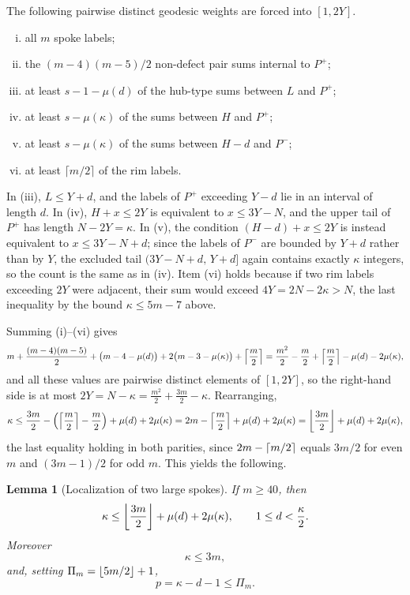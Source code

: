 \documentclass[11pt]{article}
\newtheorem{lemma}[theorem]{Lemma}
\theoremstyle{definition}
\theoremstyle{remark}
\numberwithin{equation}{section}
\DeclarePairedDelimiter{\floor}{\lfloor}{\rfloor}
\DeclarePairedDelimiter{\ceil}{\lceil}{\rceil}
\begin{document}
The following pairwise distinct geodesic weights are forced into $[1,2Y]$.
\begin{enumerate}[(i)]
\item all $m$ spoke labels;
\item the $(m-4)(m-5)/2$ non-defect pair sums internal to $P^+$;
\item at least $s-1-\mu(d)$ of the hub-type sums between $L$ and $P^+$;
\item at least $s-\mu(\kappa)$ of the sums between $H$ and $P^+$;
\item at least $s-\mu(\kappa)$ of the sums between $H-d$ and $P^-$;
\item at least $\lceil m/2\rceil$ of the rim labels.
\end{enumerate}
In (iii), $L\le Y+d$, and the labels of $P^+$ exceeding $Y-d$ lie in an interval of length $d$. In (iv), $H+x\le2Y$ is equivalent to $x\le3Y-N$, and the upper tail of $P^+$ has length $N-2Y=\kappa$. In (v), the condition $(H-d)+x\le2Y$ is instead equivalent to $x\le3Y-N+d$; since the labels of $P^-$ are bounded by $Y+d$ rather than by $Y$, the excluded tail $(3Y-N+d,\,Y+d]$ again contains exactly $\kappa$ integers, so the count is the same as in (iv). Item (vi) holds because if two rim labels exceeding $2Y$ were adjacent, their sum would exceed $4Y=2N-2\kappa>N$, the last inequality by the bound $\kappa\le5m-7$ above.

Summing (i)--(vi) gives
\[
  m+\frac{(m-4)(m-5)}2+\bigl(m-4-\mu(d)\bigr)+2\bigl(m-3-\mu(\kappa)\bigr)+\ceil*{\frac m2}
  =\frac{m^2}2-\frac m2+\ceil*{\frac m2}-\mu(d)-2\mu(\kappa),
\]
and all these values are pairwise distinct elements of $[1,2Y]$, so the right-hand side is at most $2Y=N-\kappa=\tfrac{m^2}2+\tfrac{3m}2-\kappa$. Rearranging,
\[
  \kappa\le\frac{3m}2-\left(\ceil*{\frac m2}-\frac m2\right)+\mu(d)+2\mu(\kappa)
  =2m-\ceil*{\frac m2}+\mu(d)+2\mu(\kappa)
  =\floor*{\frac{3m}2}+\mu(d)+2\mu(\kappa),
\]
the last equality holding in both parities, since $2m-\ceil{m/2}$ equals $3m/2$ for even $m$ and $(3m-1)/2$ for odd $m$. This yields the following.

\begin{lemma}[Localization of two large spokes]\label{lem:two-large-position}
If $m\ge40$, then
\begin{equation}\label{eq:z-fixedpoint}
  \kappa\le\floor*{\frac{3m}{2}}+\mu(d)+2\mu(\kappa),
  \qquad 1\le d<\frac\kappa2.
\end{equation}
Moreover
\begin{equation}\label{eq:z-3m}
  \kappa\le3m,
\end{equation}
and, setting $\Pi_m=\floor{5m/2}+1$,
\begin{equation}\label{eq:p-Pm}
  p=\kappa-d-1\le \Pi_m.
\end{equation}
\end{lemma}
\end{document}
